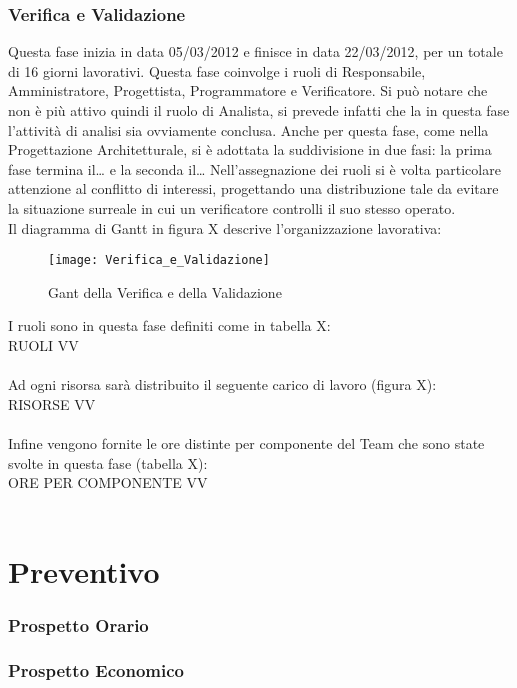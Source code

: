 \subsubsection{Verifica e Validazione}
Questa fase inizia in data 05/03/2012 e finisce in data 22/03/2012, per un totale di 16 giorni lavorativi.
Questa fase coinvolge i ruoli di Responsabile, Amministratore, Progettista, Programmatore e Verificatore. Si può notare che non è più attivo quindi il ruolo di Analista, si prevede infatti che la in questa fase l’attività di analisi sia ovviamente conclusa.
Anche per questa fase, come nella Progettazione Architetturale, si è adottata la suddivisione in due fasi: la prima fase termina il… e la seconda il…
Nell’assegnazione dei ruoli si è volta particolare attenzione al conflitto di interessi,  progettando una distribuzione tale da evitare la situazione surreale in cui un verificatore controlli il suo stesso operato.\\
Il diagramma di Gantt in figura X descrive l'organizzazione lavorativa:\\
\begin{figure}[h]
  \texttt{[image: Verifica\_e\_Validazione]}
\caption{Gant della Verifica e della Validazione}
\end{figure}
I ruoli sono in questa fase definiti come in tabella X:\\
RUOLI VV\\\\
Ad ogni risorsa sarà distribuito il seguente carico di lavoro (figura X):\\
RISORSE VV\\\\
Infine vengono fornite le ore distinte per componente del Team che sono state svolte in questa fase (tabella X):\\
ORE PER COMPONENTE VV\\\\

\section{Preventivo}
\subsubsection{Prospetto Orario}
\subsubsection{Prospetto Economico}

